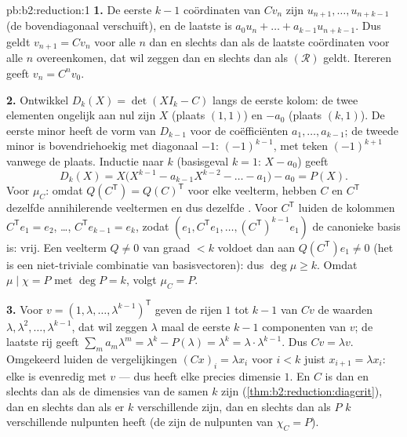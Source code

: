 \begin{solution}{pb:b2:reduction:1}
\textbf{1.} De eerste $k - 1$ coördinaten van $Cv_n$ zijn $u_{n+1},
\dots, u_{n+k-1}$ (de bovendiagonaal verschuift), en de laatste is
$a_0 u_n + \dots + a_{k-1}u_{n+k-1}$. Dus geldt $v_{n+1} = Cv_n$
voor alle $n$ dan en slechts dan als de laatste coördinaten voor
alle $n$ overeenkomen, dat wil zeggen dan en slechts dan als
$(\mathcal R)$ geldt. Itereren geeft $v_n = C^nv_0$.

\textbf{2.} Ontwikkel $D_k(X) = \det(XI_k - C)$ langs de eerste
kolom: de twee elementen ongelijk aan nul zijn $X$ (plaats $(1,1)$)
en $-a_0$ (plaats $(k,1)$). De eerste minor heeft de vorm van
$D_{k-1}$ voor de coëfficiënten $a_1, \dots, a_{k-1}$; de tweede
minor is bovendriehoekig met diagonaal $-1$: 
$(-1)^{k-1}$, met teken $(-1)^{k+1}$ vanwege de plaats. Inductie
naar $k$ (basisgeval $k = 1$: $X - a_0$) geeft
\[
D_k(X) = X\bigl(X^{k-1} - a_{k-1}X^{k-2} - \dots - a_1\bigr) -
a_0 = P(X).
\]
Voor $\mu_C$: omdat $Q(C^{\mathsf T}) = Q(C)^{\mathsf T}$ voor elke
veelterm, hebben $C$ en $C^{\mathsf T}$ dezelfde annihilerende
veeltermen en dus dezelfde . Voor $C^{\mathsf T}$
luiden de kolommen $C^{\mathsf T}e_1 = e_2$, \dots, $C^{\mathsf
T}e_{k-1} = e_k$, zodat $(e_1, C^{\mathsf T}e_1, \dots, (C^{\mathsf
T})^{k-1}e_1)$ de canonieke basis is: vrij. Een veelterm $Q \neq 0$
van graad $< k$ voldoet dan aan $Q(C^{\mathsf T})e_1 \neq 0$ (het
is een niet-triviale combinatie van basisvectoren): dus $\deg\mu
\geq k$. Omdat $\mu \mid \chi = P$ met $\deg P = k$, volgt $\mu_C =
P$.

\textbf{3.} Voor $v = (1, \lambda, \dots, \lambda^{k-1})^{\mathsf
T}$ geven de rijen $1$ tot $k-1$ van $Cv$ de waarden $\lambda,
\lambda^2, \dots, \lambda^{k-1}$, dat wil zeggen $\lambda$ maal de
eerste $k - 1$ componenten van $v$; de laatste rij geeft $\sum_m
a_m\lambda^m = \lambda^k - P(\lambda) = \lambda^k =
\lambda\cdot\lambda^{k-1}$. Dus $Cv = \lambda v$. Omgekeerd luiden
de vergelijkingen $(Cx)_i = \lambda x_i$ voor $i < k$ juist
$x_{i+1} = \lambda x_i$: elke  is evenredig met $v$ ---
dus heeft elke  precies dimensie $1$. En $C$ is
 dan en slechts dan als de dimensies van de
 samen $k$ zijn (\cref{thm:b2:reduction:diagcrit}), dan
en slechts dan als er $k$ verschillende  zijn, dan en
slechts dan als $P$ $k$ verschillende nulpunten heeft (de
 zijn de nulpunten van $\chi_C = P$).


\end{solution}
